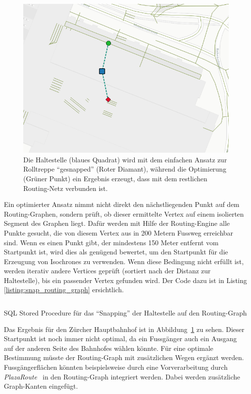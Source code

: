 \begin{figure}[ht]
    \centering
    \includegraphics[width=1\linewidth]{projectdoc/img/snapping_comparison}
    \caption[Snapping der Haltestelle auf den Routing-Graphen]{Die Haltestelle (blaues Quadrat) wird mit dem einfachen Ansatz zur Rolltreppe "`gesnapped"' (Roter Diamant), während die Optimierung (Grüner Punkt) ein Ergebnis erzeugt, dass mit dem restlichen Routing-Netz verbunden ist.}
    \label{fig:snapping_comparison}
\end{figure}

Ein optimierter Ansatz nimmt nicht direkt den nächstliegenden Punkt auf dem Routing-Graphen, sondern prüft, ob dieser ermittelte Vertex auf einem isolierten Segment des Graphen liegt.
Dafür werden mit Hilfe der Routing-Engine alle Punkte gesucht, die von diesem Vertex aus in 200 Metern Fussweg erreichbar sind.
Wenn es einen Punkt gibt, der mindestens 150 Meter entfernt vom Startpunkt ist, wird dies als genügend bewertet, um den Startpunkt für die Erzeugung von \glspl{Isochrone} zu verwenden.
Wenn diese Bedingung nicht erfüllt ist, werden iterativ andere Vertices geprüft (sortiert nach der Distanz zur Haltestelle), bis ein passender Vertex gefunden wird.
Der Code dazu ist in Listing \ref{listing:snap_routing_graph} ersichtlich.

\begin{listing}[ht]
    \inputminted{sql}{projectdoc/listing/nearest_neighbor.sql}
    \caption{SQL Stored Procedure für das "`Snapping"' der Haltestelle auf den Routing-Graph}
    \label{listing:snap_routing_graph}
\end{listing}

Das Ergebnis für den Zürcher Hauptbahnhof ist in Abbildung~\ref{fig:snapping_comparison} zu sehen.
Dieser Startpunkt ist noch immer nicht optimal, da ein Fussgänger auch ein Ausgang auf der anderen Seite des Bahnhofes wählen könnte.
Für eine optimale Bestimmung müsste der Routing-Graph mit zusätzlichen Wegen ergänzt werden.
Fussgängerflächen könnten beispielsweise durch eine Vorverarbeitung durch \emph{PlazaRoute}~\cite{plaza_route} in den Routing-Graph integriert werden. Dabei werden zusätzliche Graph-Kanten eingefügt.


